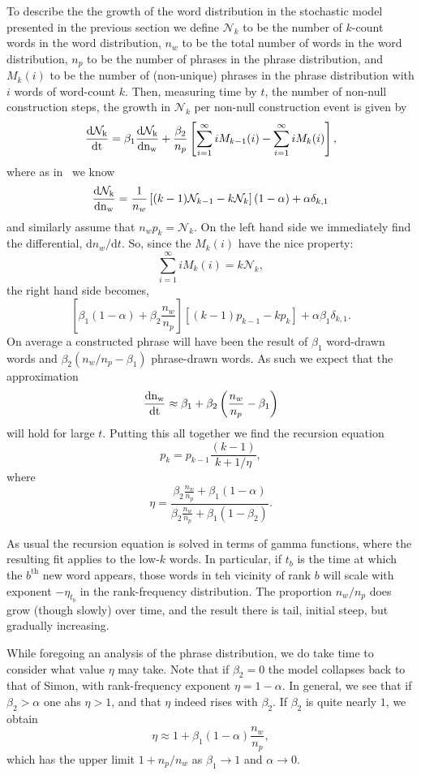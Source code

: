 To describe the the growth of the word distribution in the stochastic
model presented in the previous section we define $\mathcal{N}_k$ to be the
number of $k$-count words in the word distribution, $n_w$ to be the
total number of words in the word distribution, $n_p$ to be the number
of phrases in the phrase distribution, and $M_k(i)$ to be the number
of (non-unique) phrases in the phrase distribution with $i$ words of
word-count $k$. Then, measuring time by $t$, the number of non-null
construction steps, the growth in $\mathcal{N}_k$ per non-null construction
event is given by
\begin{equation}
\frac{\rm{d}\mathcal{N}_k}{\rm{d}t}
=
\beta_1\frac{\rm{d}\mathcal{N}_k}{\rm{d}n_w}
+
\frac{\beta_2}{n_p}
\left[
  \sum_{i=1}^\infty iM_{k-1}(i)-\sum_{i=1}^\infty iM_{k}(i)
\right],
\end{equation}
where as in~\cite{simon1955a,krapivsky2001a} we know
$$\frac{\rm{d}\mathcal{N}_k}{\rm{d}n_w}=\frac{1}{n_w}\left[(k-1)\mathcal{N}_{k-1}-k\mathcal{N}_k\right](1-\alpha)+\alpha\delta_{k,1}$$
and similarly assume that $n_wp_k=\mathcal{N}_k$. On the left hand side we
immediately find the differential,
$\text{d}n_{w}/\text{d}t$.  
So, since the $M_k(i)$ have the nice property:
$$
\sum_{i=1}^{\infty}
iM_{k}(i) 
=
k\mathcal{N}_k,
$$
the right hand side becomes,
$$
\left[
\beta_1(1-\alpha)
+
\beta_2
\frac{n_w}{n_p}
\right]
\left[
(k-1)p_{k-1}-kp_k
\right]
+\alpha\beta_1\delta_{k,1}.
$$
On average a constructed phrase will have been the result of $\beta_1$
word-drawn words and $\beta_2(n_w/n_p-\beta_1)$ phrase-drawn words. As
such we expect that the approximation
$$\frac{\rm{d} n_w}{\rm{d}t}\approx\beta_1+\beta_2\left(\frac{n_w}{n_p}-\beta_1\right)$$
will hold for large $t$. Putting this all together we find the recursion equation
$$p_k=p_{k-1}\frac{(k-1)}{k+1/\eta},$$
where
$$\eta=\frac{\beta_2\frac{n_w}{n_p}+\beta_1(1-\alpha)}{\beta_2\frac{n_w}{n_p}+\beta_1(1-\beta_2)}.$$

As usual the recursion equation is solved in terms of gamma functions,
where the resulting fit applies to the low-$k$ words. In particular,
if $t_b$ is the time at which the $b^\text{th}$ new word
appears, those words in teh vicinity of rank $b$ will scale with
exponent $-\eta_{t_b}$ in the rank-frequency distribution. The
proportion $n_w/n_p$ does grow (though slowly) over time, and the
result there is tail, initial steep, but gradually increasing.

While foregoing an analysis of the phrase distribution, we do take
time to consider what value $\eta$ may take. Note that if $\beta_2=0$
the model collapses back to that of Simon, with rank-frequency
exponent $\eta=1-\alpha$. In general, we see that if $\beta_2>\alpha$
one ahs $\eta>1$, and that $\eta$ indeed rises with $\beta_2$. If
$\beta_2$ is quite nearly $1$, we obtain
$$\eta\approx1+\beta_1(1-\alpha)\frac{n_w}{n_p},$$
which has the upper limit $1+n_p/n_w$ as $\beta_1\rightarrow 1$ and
$\alpha\rightarrow 0$.

